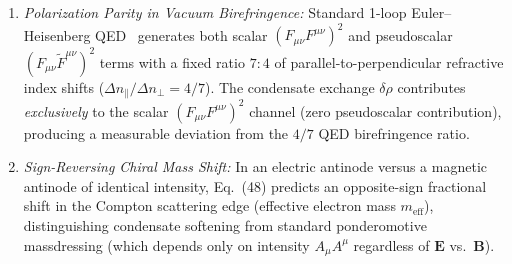 \documentclass[11pt,a4paper]{article}
\begin{document}
\begin{itemize}
    \begin{enumerate}
        \item \emph{Polarization Parity in Vacuum Birefringence:} Standard 1-loop Euler--Heisenberg QED~\cite{HeisenbergEuler1936} generates both scalar $(F_{\mu\nu}F^{\mu\nu})^2$ and pseudoscalar $(F_{\mu\nu}\tilde{F}^{\mu\nu})^2$ terms with a fixed ratio $7 : 4$ of parallel-to-perpendicular refractive index shifts ($\Delta n_\parallel / \Delta n_\perp = 4/7$). The condensate exchange $\delta\rho$ contributes \emph{exclusively} to the scalar $(F_{\mu\nu}F^{\mu\nu})^2$ channel (zero pseudoscalar contribution), producing a measurable deviation from the $4/7$ QED birefringence ratio.
        \item \emph{Sign-Reversing Chiral Mass Shift:} In an electric antinode versus a magnetic antinode of identical intensity, Eq.\ (48) predicts an opposite-sign fractional shift in the Compton scattering edge (effective electron mass $m_{\text{eff}}$), distinguishing condensate softening from standard ponderomotive massdressing (which depends only on intensity $A_\mu A^\mu$ regardless of $\mathbf{E}$ vs.\ $\mathbf{B}$).
    \end{enumerate}
\end{itemize}
\end{document}
